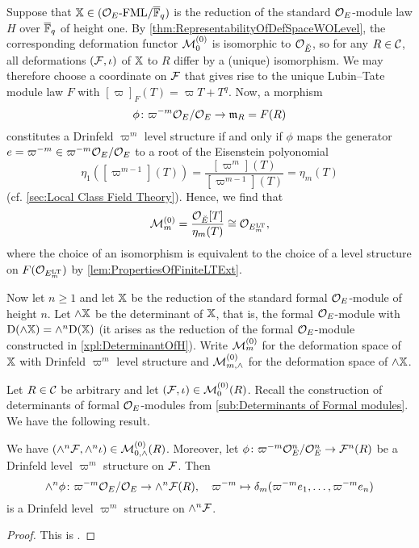 \documentclass[../main.tex]{subfiles}
\begin{document}
Suppose that $\mathbb{X} \in {({\mathcal{O}_E}\textnormal-\allowbreak\mathrm{FML}/{{\overline{\mathbb{F}}_q}})}$ is the reduction of the standard
$\mathcal{O}_E$-module law $H$ over ${\overline {\mathbb{F}}_q}$ of height one. 
By \cref{thm:RepresentabilityOfDefSpaceWOLevel}, the corresponding deformation functor
$\mathcal{M}_0^{(0)}$ is isomorphic to $\mathcal{O}_{\breve {E}}$, so for any $R \in \mathcal{C}$, all deformations
$(\mathcal{F}, \iota)$ of $\mathbb{X}$ to $R$ differ by a (unique) isomorphism. We may therefore
choose a coordinate on
$\mathcal{F}$ that gives rise to the unique Lubin--Tate module law $F$ with
$[\varpi]_F(T) = \varpi T + T^q$. Now, a morphism 
\begin{equation*}
  \phi \colon \varpi^{-m}\mathcal{O}_E / \mathcal{O}_E \to \mathfrak{m}_R = F(R)
\end{equation*}
constitutes a Drinfeld $\varpi^m$ level structure if and only if 
$\phi$ maps the generator $e = \varpi^{-m} \in \varpi^{-m} \mathcal{O}_E/\mathcal{O}_E$ 
to a root of the Eisenstein polyonomial 
\begin{equation*}
  \eta_1([\varpi^{m-1}](T)) = \frac{[\varpi^m](T)}{[\varpi^{m-1}](T)} = \eta_m(T)
\end{equation*}
(cf. \cref{sec:Local Class Field Theory}). 
Hence, we find that 
\begin{equation}\label{eq:HeightOneDefSpaceIsOEm}
  \mathcal{M}_{m}^{(0)} = \frac{\mathcal{O}_{\breve {E}}[T]}{\eta_m(T)} \cong \mathcal{O}_{E_m^{\mathrm{LT}}},
\end{equation}
where the choice of an isomorphism is equivalent to the choice of a level structure 
on $F(\mathcal{O}_{E_m^{\mathrm{LT}}})$ by \cref{lem:PropertiesOfFiniteLTExt}. 

Now let $n \geq 1$ and let $\mathbb{X}$ be the reduction of the standard formal 
$\mathcal{O}_E$-module of height $n$. Let $\wedge \mathbb{X}$ be the determinant of $\mathbb{X}$,
that is, the formal $\mathcal{O}_E$-module with $\mathrm{D}(\wedge \mathbb{X}) = \wedge^n \mathrm{D}(\mathbb{X})$
(it arises as the reduction of the formal $\mathcal{O}_E$-module constructed in
\cref{xpl:DeterminantOfH}).
Write $\mathcal{M}_m^{(0)}$ for the deformation space of $\mathbb{X}$ with Drinfeld $\varpi^m$
level structure and $\mathcal{M}_{m, \wedge}^{(0)}$ for the deformation space of $\wedge \mathbb{X}$. 

Let $R \in \mathcal{C}$ be arbitrary and let $(\mathcal{F}, \iota) \in \mathcal{M}_0^{(0)}(R)$. 
Recall the construction of determinants of formal $\mathcal{O}_E$-modules
from \cref{sub:Determinants of Formal modules}. We have the following result.

\begin{lem}\label{lem:DeterminantOfDrinfeldStructure}
  We have $(\wedge^n \mathcal{F}, \wedge^n \iota) \in \mathcal{M}_{0, \wedge}^{(0)}(R)$.
  Moreover,
  let $\phi\colon \varpi^{-m} \mathcal{O}_E^n/\mathcal{O}_E^n \to  \mathcal{F}^n(R)$ be a Drinfeld level
  $\varpi^m$ structure on $\mathcal{F}$. Then 
  \begin{equation*}
    \wedge^n \phi \colon \varpi^{-m} \mathcal{O}_E/\mathcal{O}_E \to \wedge^n\mathcal{F}(R), \quad 
  \varpi^{-m} \mapsto \delta_m(\varpi^{-m} e_1, \dots, \varpi^{-m} e_n)
  \end{equation*}
  is a Drinfeld level $\varpi^m$ structure on $\wedge^n \mathcal{F}$.
\begin{proof}
  This is \cite[Proposition 2.11]{weinstein2016semistable}.
\end{proof}
\end{lem}
\end{document}
